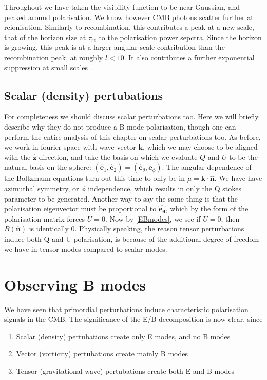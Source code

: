 \documentclass[a4paper,10pt]{article}
\renewcommand{\v}[1]{\mathbf{#1}}
\newcommand{\unit}[1]{\hat{\v{#1}}}
\begin{document}
Throughout we have taken the visibility function to be near Gaussian, and peaked around polarisation. We know however CMB photons scatter further at reionisation. Similarly to recombination, this contributes a peak at a new scale, that of the horizon size at $\tau_{re}$ to the polarisation power sepctra. Since the horizon is growing, this peak is at a larger angular scale contribution than the recombination peak, at roughly $l<10$. It also contributes a further exponential suppression at small scales \cite{reionisation2}.



\subsection{Scalar (density) pertubations}

For completeness we should discuss scalar perturbations too. Here we will briefly describe why they do not produce a B mode polarisation, though one can perform the entire analysis of this chapter on scalar perturbations too. As before, we work in fourier space with wave vector $\v{k}$, which we may choose to be aligned with the $\unit{z}$ direction, and take the basis on which we evaluate $Q$ and $U$ to be the natural basis on the sphere: $(\unit{e}_1, \unit{e}_2) = (\unit{e}_\theta, \unit{e}_\phi)$. The angular dependence of the Boltzmann equations turn out this time to only be in $\mu=\v{k}\cdot\unit{n}$. We have have azimuthal symmetry, or $\phi$ independence, which results in only the Q stokes parameter to be generated. Another way to say the same thing is that the polarisation eigenvector must be proportional to $\unit{e_\theta}$, which by the form of the polarisation matrix forces $U=0$. Now by \ref{EBmodes}, we see if $U=0$, then $B(\unit{n})$ is identically 0. Physically speaking, the reason tensor perturbations induce both Q and U polarisation, is because of the additional degree of freedom we have in tensor modes compared to scalar modes.


\section{Observing B modes}


We have seen that primordial perturbations induce characteristic polarisation signals in the CMB. The significance of the E/B decomposition is now clear, since

\begin{enumerate}
\item Scalar (density) pertubations create only E modes, and no B modes
\item Vector (vorticity) pertubations create mainly B modes
\item Tensor (gravitational wave) pertubations create both E and B modes
\end{enumerate}
\end{document}
